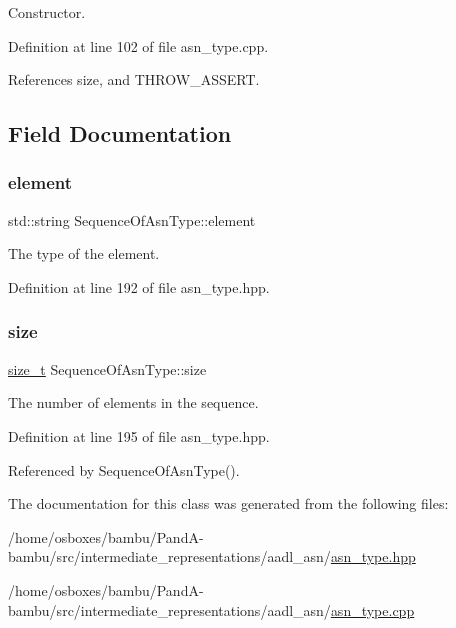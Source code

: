 Constructor. 



Definition at line 102 of file asn\+\_\+type.\+cpp.



References size, and T\+H\+R\+O\+W\+\_\+\+A\+S\+S\+E\+RT.



\subsection{Field Documentation}
\mbox{\label{classSequenceOfAsnType_acb3e394c49163d310a53b0faabdcddf2}} 
\subsubsection{\texorpdfstring{element}{element}}
{\footnotesize\ttfamily std\+::string Sequence\+Of\+Asn\+Type\+::element}



The type of the element. 



Definition at line 192 of file asn\+\_\+type.\+hpp.

\mbox{\label{classSequenceOfAsnType_adbb06897b056678141962633b00ea6ca}} 
\subsubsection{\texorpdfstring{size}{size}}
{\footnotesize\ttfamily \hyperlink{tutorial__fpt__2017_2intro_2sixth_2test_8c_a7c94ea6f8948649f8d181ae55911eeaf}{size\+\_\+t} Sequence\+Of\+Asn\+Type\+::size}



The number of elements in the sequence. 



Definition at line 195 of file asn\+\_\+type.\+hpp.



Referenced by Sequence\+Of\+Asn\+Type().



The documentation for this class was generated from the following files\+:\begin{DoxyCompactItemize}
\item 
/home/osboxes/bambu/\+Pand\+A-\/bambu/src/intermediate\+\_\+representations/aadl\+\_\+asn/\hyperlink{asn__type_8hpp}{asn\+\_\+type.\+hpp}\item 
/home/osboxes/bambu/\+Pand\+A-\/bambu/src/intermediate\+\_\+representations/aadl\+\_\+asn/\hyperlink{asn__type_8cpp}{asn\+\_\+type.\+cpp}\end{DoxyCompactItemize}
